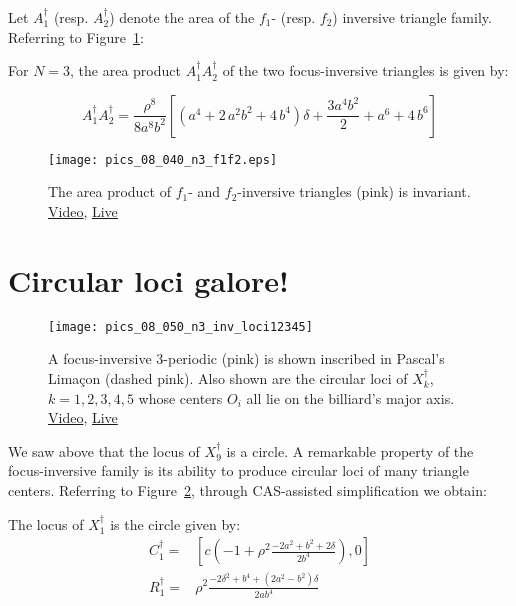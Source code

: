 Let $A_1^\dagger$ (resp. $A_2^\dagger$) denote the area of the $f_1$- (resp. $f_2$) inversive triangle family. Referring to Figure~\ref{fig:08-inv-pedals}:

\begin{proposition}
For $N=3$, the area product $A_1^\dagger A_2^\dagger$ of the two focus-inversive triangles is given by:

\[ A_1^\dagger A_2^\dagger= \frac{\rho^8}{8 a^8 b^2}  \left[\left( {a}^{4}+2\,{a}^{2}{b}^{2}+4\,{b}^{4} \right)\delta +  \frac{3 a^{4} b^{2}}{2}+a^6+4\,{b}^{6} \right]
\]
\end{proposition}

\begin{figure}
    \centering
    \texttt{[image: pics\_08\_040\_n3\_f1f2.eps]}
    \caption{The area product of $f_1$- and $f_2$-inversive triangles (pink) is invariant. \href{https://youtu.be/0L2uMk2xyKk}{Video}, \href{https://bit.ly/3i1iPCM}{Live}}
    \label{fig:08-inv-pedals}
\end{figure}

\section{Circular loci galore!}

\begin{figure}
    \centering
    \texttt{[image: pics\_08\_050\_n3\_inv\_loci12345]}
    \caption{A focus-inversive 3-periodic (pink) is shown inscribed in Pascal's Limaçon (dashed pink). Also shown are the circular loci of $X_k^\dagger$, $k=1,2,3,4,5$ whose centers $O_i$ all lie on the billiard's major axis. \href{https://youtu.be/OAD2hpCRgCI}{Video}, \href{https://bit.ly/3fW3W1A}{Live}}
    \label{fig:08-n3-loci-12345}
\end{figure}

We saw above that the locus of $X_9^\dagger$ is a circle. A remarkable property of the focus-inversive family is its ability to produce circular loci of many triangle centers. Referring to Figure~\ref{fig:08-n3-loci-12345}, through CAS-assisted simplification we obtain:

\begin{proposition}
The locus of $X_1^\dagger$ is the circle given by:
\begin{align*}
C_1^\dagger=&\left[c\left(-1+\rho^2\frac{-2a^2+b^2+2\delta}{2b^4}\right), 0\right]\\
R_1^\dagger=&\rho^2\frac{-2\delta^2+b^4+(2a^2-b^2)\delta}{2ab^4}
\end{align*}
\end{proposition}

